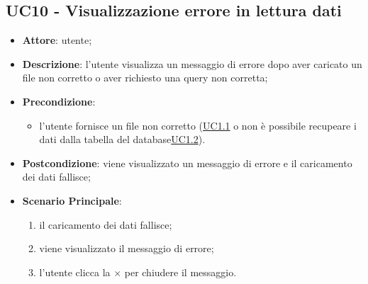 \subsection{UC10 - Visualizzazione errore in lettura dati}
    \label{uc10}
    \begin{itemize}
    \item \textbf{Attore}: utente;
    \item \textbf{Descrizione}: l'utente visualizza un messaggio di errore dopo aver caricato un file non corretto o aver richiesto una query non corretta;
    \item \textbf{Precondizione}: 
    \begin{itemize}
        \item l'utente fornisce un file non corretto (\hyperref[uc1.1]{UC1.1} o non è possibile recupeare i dati dalla tabella del database\hyperref[uc1.2]{UC1.2}).
    \end{itemize}  
    \item \textbf{Postcondizione}: viene visualizzato un messaggio di errore e il caricamento dei dati fallisce;
    \item \textbf{Scenario Principale}: 
    \begin{enumerate}
        \item il caricamento dei dati fallisce;
        \item viene visualizzato il messaggio di errore;
        \item l'utente clicca la $\times$ per chiudere il messaggio.
    \end{enumerate}
    \end{itemize}
